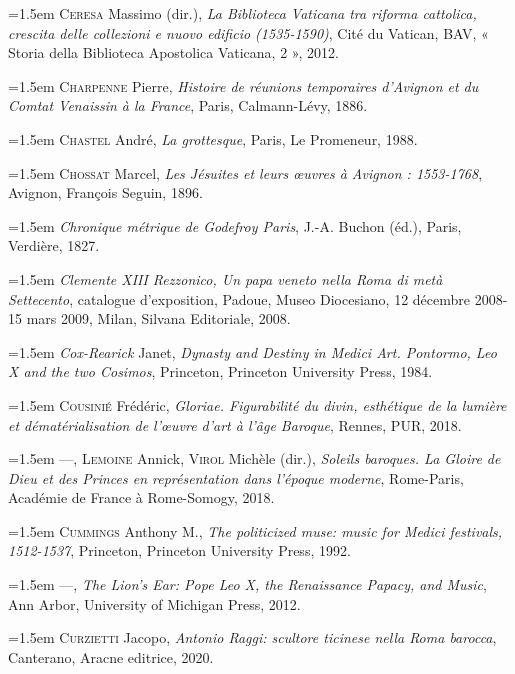 \documentclass[12pt,twoside,openany]{book}
\newenvironment{PurhBibliography}
  {%
    \par
    \setlength{\parindent}{0pt}%
    \setlength{\leftskip}{0pt}%
  }
  {%
    \par
  }
\begin{document}
\begin{PurhBibliography}
\noindent\hangindent=1.5em \textsc{Ceresa} Massimo (dir.), \textit{La Biblioteca Vaticana tra riforma cattolica, crescita delle collezioni e nuovo edificio (1535-1590)}, Cité du Vatican, BAV, « Storia della Biblioteca Apostolica Vaticana, 2 », 2012.\par
\noindent\hangindent=1.5em \textsc{Charpenne} Pierre, \textit{Histoire de réunions temporaires d’Avignon et du Comtat Venaissin à la France}, Paris, Calmann-Lévy, 1886.\par
\noindent\hangindent=1.5em \textsc{Chastel} André, \textit{La grottesque}, Paris, Le Promeneur, 1988.\par
\noindent\hangindent=1.5em \textsc{Chossat} Marcel, \textit{Les Jésuites et leurs œuvres à Avignon : 1553-1768}, Avignon, François Seguin, 1896.\par
\noindent\hangindent=1.5em \textit{Chronique métrique de Godefroy Paris}, J.-A. Buchon (éd.), Paris, Verdière, 1827.\par
\noindent\hangindent=1.5em \textit{Clemente XIII Rezzonico, Un papa veneto nella Roma di metà Settecento}, catalogue d’exposition, Padoue, Museo Diocesiano, 12 décembre 2008-15 mars 2009, Milan, Silvana Editoriale, 2008.\par
\noindent\hangindent=1.5em \textit{Cox}\textit{\textsc{-}}\textit{Rearick} Janet, \textit{Dynasty and Destiny in Medici Art. Pontormo, Leo X and the two Cosimos}, Princeton, Princeton University Press, 1984.\par
\noindent\hangindent=1.5em \textsc{Cousinié} Frédéric, \textit{Gloriae. Figurabilité du divin, esthétique de la lumière et dématérialisation de l’œuvre d’art à l’âge Baroque}, Rennes, \textsc{PUR}, 2018.\par
\noindent\hangindent=1.5em —, \textsc{Lemoine} Annick, \textsc{Virol} Michèle (dir.), \textit{Soleils baroques. La Gloire de Dieu et des Princes en représentation dans l’époque moderne}, Rome-Paris, Académie de France à Rome-Somogy, 2018.\par
\noindent\hangindent=1.5em \textsc{Cummings} Anthony M., \textit{The politicized muse: music for Medici festivals, 1512-1537}, Princeton, Princeton University Press, 1992.\par
\noindent\hangindent=1.5em —, \textit{The Lion’s Ear: Pope Leo X, the Renaissance Papacy, and Music}, Ann Arbor, University of Michigan Press, 2012.\par
\noindent\hangindent=1.5em \textsc{Curzietti} Jacopo, \textit{Antonio Raggi: scultore ticinese nella Roma barocca}, Canterano, Aracne editrice, 2020.\par

\end{PurhBibliography}
\end{document}
